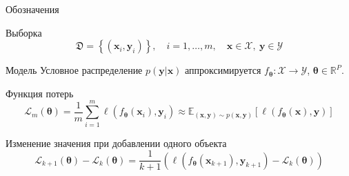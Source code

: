 \documentclass[aspectratio=169]{beamer}
\begin{document}
\begin{frame}{Обозначения}
    \begin{block}{Выборка}
        \[ \mathfrak{D} = \left\{ (\mathbf{x}_i, \mathbf{y}_i) \right\}, \quad i = 1, \ldots, m, \quad \mathbf{x} \in \mathcal{X}, \ \mathbf{y} \in \mathcal{Y} \]
    \end{block}
    \begin{block}{Модель}
        Условное распределение $p(\mathbf{y}|\mathbf{x})$ аппроксимируется $f_{\boldsymbol{\theta}}: \mathcal{X} \to \mathcal{Y}$, $\boldsymbol{\theta} \in \mathbb{R}^{P}$.
    \end{block}
    \begin{block}{Функция потерь}
        \[ \mathcal{L}_m(\boldsymbol{\theta}) = \dfrac{1}{m} \sum\limits_{i=1}^{m} \ell(f_{\boldsymbol{\theta}}(\mathbf{x}_i), \mathbf{y}_i) \approx \mathbb{E}_{(\mathbf{x}, \mathbf{y}) \sim p(\mathbf{x}, \mathbf{y})} \left[ \ell(f_{\boldsymbol{\theta}}(\mathbf{x}), \mathbf{y}) \right] \]
    \end{block}
    \vspace{-1em}
    \begin{block}{Изменение значения при добавлении одного объекта}
        \begin{equation*}
            \mathcal{L}_{k+1}(\boldsymbol{\theta}) - \mathcal{L}_k(\boldsymbol{\theta}) = \dfrac{1}{k+1} \left( \ell(f_{\boldsymbol{\theta}}(\mathbf{x}_{k+1}), \mathbf{y}_{k+1}) - \mathcal{L}_{k}(\boldsymbol{\theta}) \right)
        \end{equation*}
    \end{block}
\end{frame}
\end{document}

